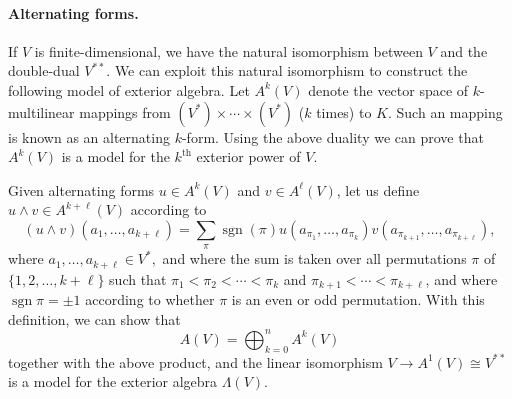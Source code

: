 \documentclass[12pt]{article}
\newcommand{\supth}{^{\text{th}}}
\begin{document}
\paragraph{Alternating forms.}
If $V$ is finite-dimensional, we have the natural isomorphism between
$V$ and the double-dual $V^{**}$.  We can exploit this natural
isomorphism to construct the following model of exterior algebra.  Let
$A^k(V)$ denote the vector space of $k$-multilinear mappings from
$(V^*)\times\cdots\times (V^*)$ ($k$ times) to $K$.  Such an mapping
is known as an alternating $k$-form.  Using the above duality we can
prove that $A^k(V)$ is a model for the $k\supth$ exterior power of
$V$.  

Given alternating forms $u\in A^k(V)$ and $v\in A^\ell(V)$,
let us define $u\wedge v\in A^{k+\ell}(V)$ according to
\[ (u\wedge v)(a_1,\dots,a_{k+\ell})= \sum_{\pi}\operatorname{sgn}(\pi)
u(a_{\pi_1},\dots,a_{\pi_k})
v(a_{\pi_{k+1}},\dots,a_{\pi_{k+\ell}}),\]
where $a_1,\dots,a_{k+\ell}\in V^*,$ and  where the sum is taken over
all permutations $\pi$ of $\{1,2,\dots, k+\ell\}$ such that $\pi_1<
\pi_2 < \cdots < \pi_k$ and $\pi_{k+1} < \cdots < \pi_{k+\ell}$, and
where $\operatorname{sgn} \pi=\pm 1$ according to whether $\pi$ is an
even or odd permutation.  With this definition, we can show that
\[ A(V) = \bigoplus_{k=0}^n A^k(V) \]
together with the above product, and the linear isomorphism $V\to
A^1(V)\cong V^{**}$ is a model for the exterior algebra $\Lambda(V)$.


\end{document}
